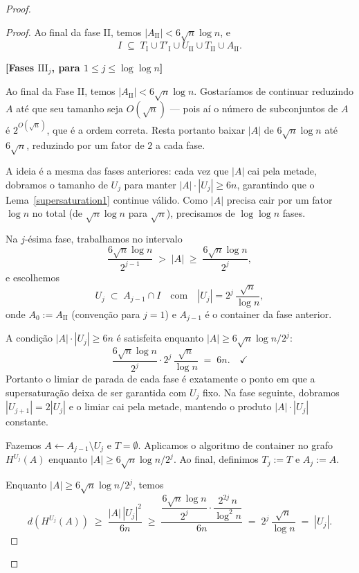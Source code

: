 \documentclass[reqno,a4paper,12pt]{amsart}
\begin{document}
\begin{proof}
\begin{proof}
    Ao final da fase II, temos $|A_{\mathrm{II}}| < 6\sqrt{n}\log n$, e
    \[
      I \;\subseteq\; T_{\mathrm{I}} \cup T'_{\mathrm{I}} \cup U_{\mathrm{II}}
      \cup T_{\mathrm{II}} \cup A_{\mathrm{II}}.
    \]


    \textbf{[Fases $\mathrm{III}_j$, para $1 \leq j \leq \log\log n$]}

    Ao final da Fase II, temos $|A_{\mathrm{II}}| < 6\sqrt{n}\log n$. Gostaríamos de continuar
    reduzindo $A$ até que seu tamanho seja $O(\sqrt{n})$ --- pois aí o número de subconjuntos de
    $A$ é $2^{O(\sqrt{n})}$, que é a ordem correta. Resta portanto baixar $|A|$ de
    $6\sqrt{n}\log n$ até $6\sqrt{n}$, reduzindo por um fator de $2$ a cada fase.

    A ideia é a mesma das fases anteriores: cada vez que $|A|$ cai pela metade, dobramos o tamanho
    de $U_j$ para manter $|A|\cdot|U_j| \geq 6n$, garantindo que o Lema~\ref{supersaturation1} continue válido.
    Como $|A|$ precisa cair por um fator $\log n$ no total (de $\sqrt{n}\log n$ para $\sqrt{n}$),
    precisamos de $\log\log n$ fases.

    Na $j$-ésima fase, trabalhamos no intervalo
    \[
      \frac{6\sqrt{n}\log n}{2^{j-1}} \;>\; |A| \;\geq\; \frac{6\sqrt{n}\log n}{2^j},
    \]
    e escolhemos
    \[
      U_j \;\subset\; A_{j-1} \cap I
      \quad\text{com}\quad
      |U_j| = 2^j\,\frac{\sqrt{n}}{\log n},
    \]
    onde $A_0 := A_{\mathrm{II}}$ (convenção para $j=1$) e $A_{j-1}$ é o container da fase anterior.

    A condição $|A|\cdot|U_j| \geq 6n$ é satisfeita enquanto $|A| \geq 6\sqrt{n}\log n / 2^j$:
    \[
      \frac{6\sqrt{n}\log n}{2^j} \cdot 2^j\,\frac{\sqrt{n}}{\log n} \;=\; 6n. \quad \checkmark
    \]
    Portanto o limiar de parada de cada fase é exatamente o ponto em que a supersaturação deixa de
    ser garantida com $U_j$ fixo. Na fase seguinte, dobramos $|U_{j+1}| = 2|U_j|$ e o limiar cai
    pela metade, mantendo o produto $|A|\cdot|U_j|$ constante.

    Fazemos $A \leftarrow A_{j-1} \setminus U_j$ e $T = \emptyset$. Aplicamos o algoritmo de
    container no grafo $H^{U_j}(A)$ enquanto $|A| \geq 6\sqrt{n}\log n / 2^j$. Ao final, definimos
    $T_j := T$ e $A_j := A$.

    Enquanto $|A| \geq 6\sqrt{n}\log n / 2^j$, temos
    \[
      d(H^{U_j}(A)) \;\geq\; \frac{|A|\,|U_j|^2}{6n}
      \;\geq\; \frac{\dfrac{6\sqrt{n}\log n}{2^j}\cdot\dfrac{2^{2j}\,n}{\log^2 n}}{6n}
      \;=\; 2^j\,\frac{\sqrt{n}}{\log n} \;=\; |U_j|.
    \]



\end{proof}
\end{proof}
\end{document}
